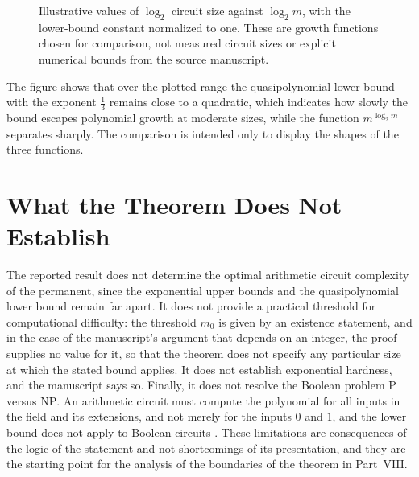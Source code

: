 \documentclass[11pt,letterpaper]{report}
\theoremstyle{plain}
\theoremstyle{definition}
\theoremstyle{remark}
\newcommand{\PTIME}{\mathrm{P}}
\newcommand{\NP}{\mathrm{NP}}
\begin{document}
\begin{figure}[ht]
\centering
{}
\caption{Illustrative values of $\log_2$ circuit size against $\log_2 m$, with the lower-bound constant normalized to one. These are growth functions chosen for comparison, not measured circuit sizes or explicit numerical bounds from the source manuscript.}
\label{fig:growth}
\end{figure}

The figure shows that over the plotted range the quasipolynomial lower bound with the exponent $\tfrac13$ remains close to a quadratic, which indicates how slowly the bound escapes polynomial growth at moderate sizes, while the function $m^{\log_2 m}$ separates sharply. The comparison is intended only to display the shapes of the three functions.

\section{What the Theorem Does Not Establish}

The reported result does not determine the optimal arithmetic circuit complexity of the permanent, since the exponential upper bounds and the quasipolynomial lower bound remain far apart. It does not provide a practical threshold for computational difficulty: the threshold $m_0$ is given by an existence statement, and in the case of the manuscript's argument that depends on an integer, the proof supplies no value for it, so that the theorem does not specify any particular size at which the stated bound applies. It does not establish exponential hardness, and the manuscript says so. Finally, it does not resolve the Boolean problem $\PTIME$ versus $\NP$. An arithmetic circuit must compute the polynomial for all inputs in the field and its extensions, and not merely for the inputs $0$ and $1$, and the lower bound does not apply to Boolean circuits \cite{Source2026}. These limitations are consequences of the logic of the statement and not shortcomings of its presentation, and they are the starting point for the analysis of the boundaries of the theorem in Part~VIII.
\end{document}
